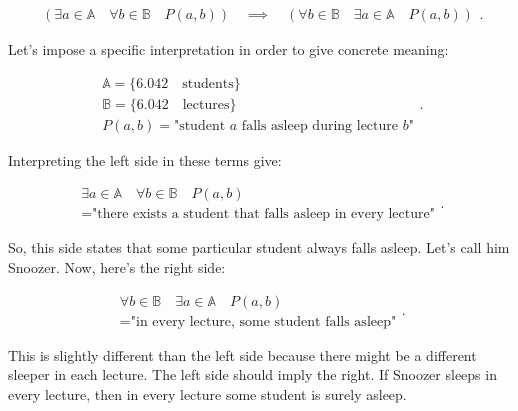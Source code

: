 \begin{theorem}

  \begin{equation}
    \begin{split}
      (\exists a \in \mathbb{A} \quad
      \forall b \in \mathbb{B} \quad
      P(a,b)) \quad
      \implies \quad
      (\forall b \in \mathbb{B} \quad
      \exists a \in \mathbb{A} \quad
      P(a,b))
    \end{split}
  .\end{equation}

  Let's impose a specific interpretation in order to give concrete meaning:

  \begin{equation}
    \begin{split}
      \mathbb{A} = \{6.042 \quad \textrm{students}\} \\
      \mathbb{B} = \{6.042 \quad \textrm{lectures}\} \\
      P(a,b) = \textrm{"student $a$ falls asleep during lecture $b$"}
    \end{split}
  .\end{equation}

  Interpreting the left side in these terms give:

  \begin{equation}
    \begin{split}
      \exists a \in \mathbb{A} \quad \forall b \in \mathbb{B} \quad P(a,b) \\
      = \textrm{"there exists a student that falls asleep in every lecture"}
    \end{split}
  .\end{equation}

  So, this side states that some particular student always falls asleep.
  Let's call him Snoozer. Now, here's the right side:

  \begin{equation}
    \begin{split}
      \forall b \in \mathbb{B} \quad \exists a \in \mathbb{A} \quad P(a,b) \\
      = \textrm{"in every lecture, some student falls asleep"}
    \end{split}
  .\end{equation}

  This is slightly different than the left side because there might be a
  different sleeper in each lecture. The left side should imply the right. If
  Snoozer sleeps in every lecture, then in every lecture some student is surely
  asleep.
\end{theorem}


\newpage
